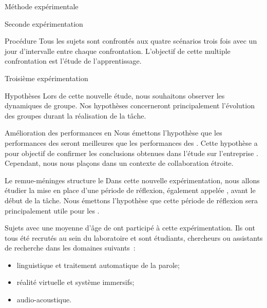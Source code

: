 \documentclass[myfrancais]{mythesis}
\begin{document}
\begin{mychapter}{Méthode expérimentale}
\begin{mysection}{Seconde expérimentation}
\begin{mysubsection}{Procédure}
				Tous les sujets sont confrontés aux quatre scénarios trois fois avec un jour d'intervalle entre chaque confrontation.
				L'objectif de cette multiple confrontation est l'étude de l'apprentissage.
			\end{mysubsection}
		\end{mysection}
		\begin{mysection}{Troisième expérimentation}
			\begin{mysubsection}{Hypothèses}
				Lors de cette nouvelle étude, nous souhaitons observer les dynamiques de groupe.
				Nos hypothèses concerneront principalement l'évolution des groupes durant la réalisation de la tâche.
				\begin{myparagraph}{ Amélioration des performances en }
					Nous émettons l'hypothèse que les performances des  seront meilleures que les performances des .
					Cette hypothèse a pour objectif de confirmer les conclusions obtenues dans l'étude sur l'entreprise \myHawthorne.
					Cependant, nous nous plaçons dans un contexte de collaboration étroite.
				\end{myparagraph}
				\begin{myparagraph}{ Le remue-méninges structure le }
					Dans cette nouvelle expérimentation, nous allons étudier la mise en place d'une période de réflexion, également appelée , avant le début de la tâche.
					Nous émettons l'hypothèse que cette période de réflexion sera principalement utile pour les .
				\end{myparagraph}
			\end{mysubsection}
			\begin{mysubsection}{Sujets}
				 avec une moyenne d'âge de  ont participé à cette expérimentation.
				Ils ont tous été recrutés au sein du laboratoire  et sont étudiants, chercheurs ou assistants de recherche dans les domaines suivants~:
				\begin{itemize}
					\item linguistique et traitement automatique de la parole;
					\item réalité virtuelle et système immersifs;
					\item audio-acoustique.

\end{itemize}
\end{mysubsection}
\end{mysection}
\end{mychapter}
\end{document}
